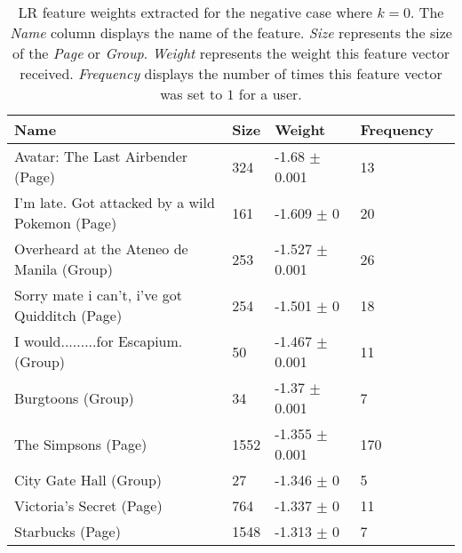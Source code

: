 \begin{table}[h]
\begin{minipage}[b]{1.0\textwidth}
\centering
  \begin{tabular}{|l|l|l|l|l|} %
  \hline
  \textbf{Name} & \textbf{Size} & \textbf{Weight} & \textbf{Frequency} \\ \hline

\small{Avatar: The Last Airbender (Page)} & 324 & -1.68 $\pm$ 0.001 & 13 \\ \hline
\small{I'm late. Got attacked by a wild Pokemon (Page)} & 161 & -1.609 $\pm$ 0 & 20 \\ \hline
\small{Overheard at the Ateneo de Manila (Group)} & 253 & -1.527 $\pm$ 0.001 & 26 \\ \hline
\small{Sorry mate i can't, i've got Quidditch (Page)} & 254 & -1.501 $\pm$ 0 & 18 \\ \hline
\small{I would.........for Escapium. (Group)} & 50 & -1.467 $\pm$ 0.001 & 11 \\ \hline
\small{Burgtoons (Group)} & 34 & -1.37 $\pm$ 0.001 & 7 \\ \hline
\small{The Simpsons (Page)} & 1552 & -1.355 $\pm$ 0.001 & 170 \\ \hline
\small{City Gate Hall (Group)} & 27 & -1.346 $\pm$ 0 & 5 \\ \hline
\small{Victoria's Secret (Page)} & 764 & -1.337 $\pm$ 0 & 11 \\ \hline
\small{Starbucks (Page)} & 1548 & -1.313 $\pm$ 0 & 7 \\ \hline
  \end{tabular}
  \caption{LR feature weights extracted for the negative case where $k=0$. The \emph{Name} column displays the name of the feature.
                        \emph{Size} represents the size of the \emph{Page} or \emph{Group}.
                        \emph{Weight} represents the weight this feature vector received.  
                        \emph{Frequency} displays the number of times this feature vector was set to $1$ for a user.}
\end{minipage}
\end{table}
